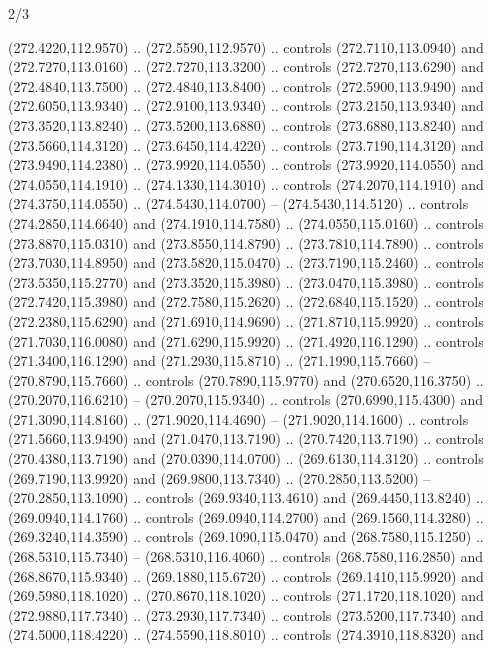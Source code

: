 \begin{flagdescription}{2/3}
\begin{scope}[xshift=0.5\flaglength,yshift=0.5\flagwidth,scale=\flagwidth/259.2]
\begin{scope}[y=0.8pt, x=0.8pt, yscale=-1,shift={(-243,-162)}]
      (272.4220,112.9570) .. (272.5590,112.9570) .. controls (272.7110,113.0940) and
      (272.7270,113.0160) .. (272.7270,113.3200) .. controls (272.7270,113.6290) and
      (272.4840,113.7500) .. (272.4840,113.8400) .. controls (272.5900,113.9490) and
      (272.6050,113.9340) .. (272.9100,113.9340) .. controls (273.2150,113.9340) and
      (273.3520,113.8240) .. (273.5200,113.6880) .. controls (273.6880,113.8240) and
      (273.5660,114.3120) .. (273.6450,114.4220) .. controls (273.7190,114.3120) and
      (273.9490,114.2380) .. (273.9920,114.0550) .. controls (273.9920,114.0550) and
      (274.0550,114.1910) .. (274.1330,114.3010) .. controls (274.2070,114.1910) and
      (274.3750,114.0550) .. (274.5430,114.0700) -- (274.5430,114.5120) .. controls
      (274.2850,114.6640) and (274.1910,114.7580) .. (274.0550,115.0160) .. controls
      (273.8870,115.0310) and (273.8550,114.8790) .. (273.7810,114.7890) .. controls
      (273.7030,114.8950) and (273.5820,115.0470) .. (273.7190,115.2460) .. controls
      (273.5350,115.2770) and (273.3520,115.3980) .. (273.0470,115.3980) .. controls
      (272.7420,115.3980) and (272.7580,115.2620) .. (272.6840,115.1520) .. controls
      (272.2380,115.6290) and (271.6910,114.9690) .. (271.8710,115.9920) .. controls
      (271.7030,116.0080) and (271.6290,115.9920) .. (271.4920,116.1290) .. controls
      (271.3400,116.1290) and (271.2930,115.8710) .. (271.1990,115.7660) --
      (270.8790,115.7660) .. controls (270.7890,115.9770) and (270.6520,116.3750) ..
      (270.2070,116.6210) -- (270.2070,115.9340) .. controls (270.6990,115.4300) and
      (271.3090,114.8160) .. (271.9020,114.4690) -- (271.9020,114.1600) .. controls
      (271.5660,113.9490) and (271.0470,113.7190) .. (270.7420,113.7190) .. controls
      (270.4380,113.7190) and (270.0390,114.0700) .. (269.6130,114.3120) .. controls
      (269.7190,113.9920) and (269.9800,113.7340) .. (270.2850,113.5200) --
      (270.2850,113.1090) .. controls (269.9340,113.4610) and (269.4450,113.8240) ..
      (269.0940,114.1760) .. controls (269.0940,114.2700) and (269.1560,114.3280) ..
      (269.3240,114.3590) .. controls (269.1090,115.0470) and (268.7580,115.1250) ..
      (268.5310,115.7340) -- (268.5310,116.4060) .. controls (268.7580,116.2850) and
      (268.8670,115.9340) .. (269.1880,115.6720) .. controls (269.1410,115.9920) and
      (269.5980,118.1020) .. (270.8670,118.1020) .. controls (271.1720,118.1020) and
      (272.9880,117.7340) .. (273.2930,117.7340) .. controls (273.5200,117.7340) and
      (274.5000,118.4220) .. (274.5590,118.8010) .. controls (274.3910,118.8320) and

\end{scope}
\end{scope}
\end{flagdescription}
